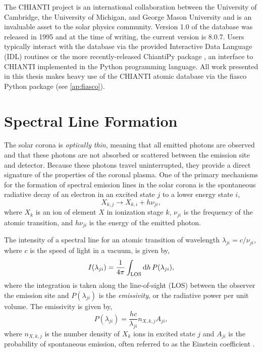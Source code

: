 The CHIANTI project is an international collaboration between the University of Cambridge, the University of Michigan, and George Mason University and is an invaluable asset to the solar physics community. Version 1.0 of the database was released in 1995 and at the time of writing, the current version is 8.0.7. Users typically interact with the database via the provided Interactive Data Language (IDL) routines or the more recently-released ChiantiPy package \citep{landi_chiantiatomic_2012,barnes_chiantipy_2017}, an interface to CHIANTI implemented in the Python programming language. All work presented in this thesis makes heavy use of the CHIANTI atomic database via the fiasco Python package (see \autoref{ap:fiasco}).

\section{Spectral Line Formation}\label{sec:line_formation}

The solar corona is \textit{optically thin}, meaning that all emitted photons are observed and that these photons are not absorbed or scattered between the emission site and detector. Because these photons travel uninterrupted, they provide a direct signature of the properties of the coronal plasma. One of the primary mechanisms for the formation of spectral emission lines in the solar corona is the spontaneous radiative decay of an electron in an excited state $j$ to a lower energy state $i$,
\begin{equation}\label{eq:radiative_decay}
    X_{k,j} \to X_{k,i} + h\nu_{ji},
\end{equation}
where $X_k$ is an ion of element $X$ in ionization stage $k$, $\nu_{ji}$ is the frequency of the atomic transition, and $h\nu_{ji}$ is the energy of the emitted photon.

The intensity of a spectral line for an atomic transition of wavelength $\lambda_{ji}=c/\nu_{ji}$, where $c$ is the speed of light in a vacuum, is given by,
\begin{equation}\label{eq:intensity}
    I(\lambda_{ji}) = \frac{1}{4\pi}\int_\textup{LOS}\textup{d}h\,P(\lambda_{ji}),
\end{equation}
where the integration is taken along the line-of-sight (LOS) between the observer the emission site and $P(\lambda_{ji})$ is the \textit{emissivity}, or the radiative power per unit volume. The emissivity is given by,
\begin{equation}\label{eq:emissivity}
    P(\lambda_{ji}) = \frac{hc}{\lambda_{ji}}n_{X,k,j}A_{ji},
\end{equation}
where $n_{X,k,j}$ is the number density of $X_k$ ions in excited state $j$ and $A_{ji}$ is the probability of spontaneous emission, often referred to as the Einstein coefficient \citep{bradshaw_collisional_2013,del_zanna_solar_2018}.

